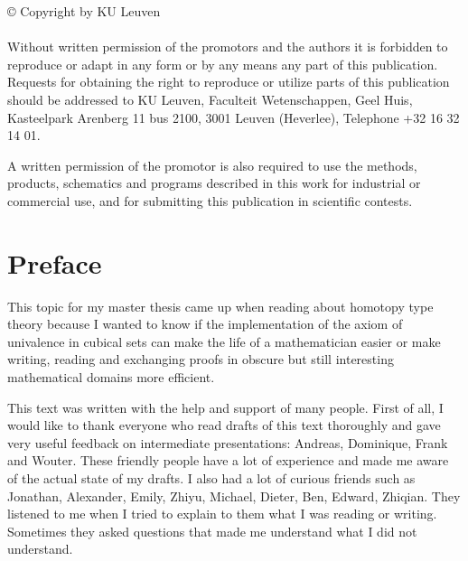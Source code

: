 \documentclass[12pt,a4paper,twoside,xetex]{book} %
\begin{document}
\rmfamily



\thispagestyle{empty}



\null

\vfill

\begin{footnotesize}
© Copyright by KU Leuven \\ \\

Without written permission of the promotors and the authors it is forbidden to reproduce or adapt in any form or by any means any part of this publication. Requests for obtaining the right to reproduce or utilize parts of this publication should be addressed to KU Leuven, Faculteit Wetenschappen, Geel Huis, Kasteelpark Arenberg 11 bus 2100, 3001 Leuven (Heverlee), Telephone +32 16 32 14 01.

A written permission of the promotor is also required to use the methods, products, schematics and programs described in this work for industrial or commercial use, and for submitting this publication in scientific contests.
\end{footnotesize}


\clearpage 

\clearpage

\setcounter{page}{0}

\chapter*{Preface}

This topic for my master thesis came up when reading about homotopy type 
theory because I wanted to know if the implementation of the axiom of 
univalence in cubical sets can make the life of a mathematician easier or
make writing, reading and exchanging proofs in obscure but still interesting 
mathematical domains more efficient.

This text was written with the help and support of many people. First of all, I 
would like to thank everyone who read drafts of this text thoroughly and gave 
very useful feedback on intermediate presentations: Andreas, Dominique, Frank and Wouter. These friendly people have a lot of experience and made me aware of the actual state of my drafts. I also had a lot of curious friends such as Jonathan, Alexander, Emily, Zhiyu, Michael, Dieter, Ben, Edward, Zhiqian.  They listened to me when I tried to explain to them what I was reading or writing. Sometimes they asked questions 
that made me understand what I did not understand.
\\
\end{document}
